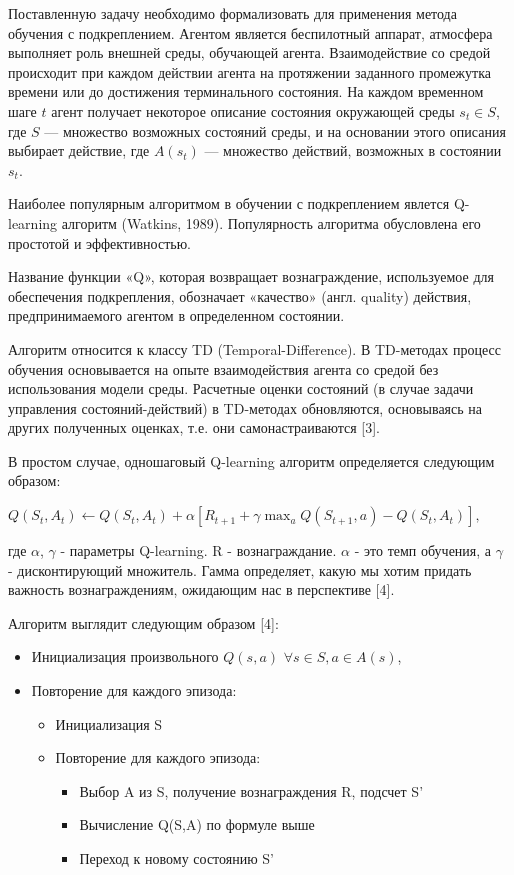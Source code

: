 \documentclass[a4paper]{report}
\theoremstyle{definition}
\theoremstyle{plain}
\theoremstyle{remark}
\theoremstyle{remark}
\theoremstyle{definition}
\begin{document}
Поставленную задачу необходимо формализовать для применения метода обучения с подкреплением. Агентом является беспилотный аппарат, атмосфера выполняет роль внешней среды, обучающей агента. Взаимодействие со средой происходит при каждом действии агента на протяжении заданного промежутка времени или до достижения терминального состояния. На каждом временном шаге $ t $ агент получает некоторое описание состояния окружающей среды $ s_{t} \in S$, где $ S $ — множество возможных состояний среды, и на основании этого описания выбирает действие, где $ A(s_{t}) $ — множество действий, возможных в состоянии $s_{t}$.

Наиболее популярным алгоритмом в обучении с подкреплением явлется Q-learning алгоритм (Watkins, 1989). Популярность алгоритма обусловлена его простотой и эффективностью.

Название функции «Q», которая возвращает вознаграждение, используемое для обеспечения подкрепления, обозначает «качество» (англ. quality) действия, предпринимаемого агентом в определенном состоянии. 

Алгоритм относится к классу TD (Temporal-Difference). В TD-методах процесс обучения основывается на опыте взаимодействия агента со средой без использования модели среды. Расчетные оценки состояний (в случае задачи управления состояний-действий) в TD-методах обновляются, основываясь на других полученных оценках, т.е. они самонастраиваются [3].

В простом случае, одношаговый Q-learning алгоритм определяется следующим образом:
\begin{center}
    $
    Q(S_{t}, A_{t}) \leftarrow Q(S_{t}, A_{t}) + \alpha[R_{t+1} + \gamma \max_{a} Q(S_{t+1}, a) - Q(S_{t}, A_{t})],
    $
\end{center}
где $\alpha$, $\gamma$ - параметры Q-learning. R - вознаграждание. $\alpha$ - это темп обучения, а $\gamma$ - дисконтирующий множитель. Гамма определяет, какую мы хотим придать важность вознаграждениям, ожидающим нас в перспективе [4].

Алгоритм выглядит следующим образом [4]:
\begin{itemize}
    \item Инициализация произвольного $Q(s,a)$ $\forall s \in S, a \in A(s)$,
    \item Повторение для каждого эпизода:
    \begin{itemize}
        \item Инициализация S
        \item Повторение для каждого эпизода:
        \begin{itemize}
            \item Выбор A из S, получение вознаграждения R, подсчет S'
            \item Вычисление Q(S,A) по формуле выше
            \item Переход к новому состоянию S'
        \end{itemize}
    \end{itemize}
\end{itemize}
\end{document}
